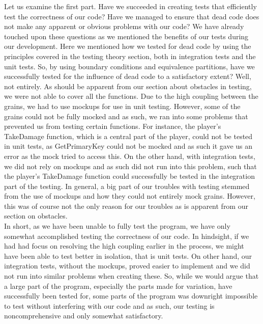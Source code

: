 Let us examine the first part. Have we succeeded in creating tests that efficiently test the correctness of our code? Have we managed to ensure that dead code does not make any apparent or obvious problems with our code? We have already touched upon these questions as we mentioned the benefits of our tests during our development. Here we mentioned how we tested for dead code by using the principles covered in the testing theory section, both in integration tests and the unit tests. So, by using boundary conditions and equivalence partitions, have we successfully tested for the influence of dead code to a satisfactory extent? Well, not entirely. As should be apparent from our section about obstacles in testing, we were not able to cover all the functions. Due to the high coupling between the grains, we had to use mockups for use in unit testing. However, some of the grains could not be fully mocked and as such, we ran into some problems that prevented us from testing certain functions. For instance, the player's TakeDamage function, which is a central part of the player, could not be tested in unit tests, as GetPrimaryKey could not be mocked and as such it gave us an error as the mock tried to access this. On the other hand, with integration tests, we did not rely on mockups and as such did not run into this problem, such that the player's TakeDamage function could successfully be tested in the integration part of the testing. In general, a big part of our troubles with testing stemmed from the use of mockups and how they could not entirely mock grains. However, this was of course not the only reason for our troubles as is apparent from our section on obstacles. \\
In short, as we have been unable to fully test the program, we have only somewhat accomplished testing the correctness of our code. In hindsight, if we had had focus on resolving the high coupling earlier in the process, we might have been able to test better in isolation, that is unit tests. On other hand, our integration tests, without the mockups, proved easier to implement and we did not run into similar problems when creating these. So, while we would argue that a large part of the program, especially the parts made for variation, have successfully been tested for, some parts of the program was downright impossible to test without interfering with our code and as such, our testing is noncomprehensive and only somewhat satisfactory. \\
\\
